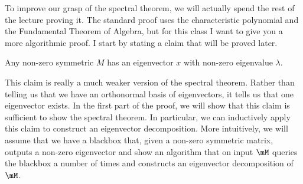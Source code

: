 To improve our grasp of the spectral theorem, we will actually spend the rest of the lecture proving it. The standard proof uses the characteristic polynomial and the Fundamental Theorem of Algebra, but for this class I want to give you a more algorithmic proof. I start by stating a claim that will be proved later.
\begin{claim} \label{claim}
Any non-zero symmetric $M$ has an eigenvector $x$ with non-zero eigenvalue $\lambda.$ 
\end{claim}
This claim is really a much weaker version of the spectral theorem. Rather than telling us that we have an orthonormal basis of eigenvectors, it tells us that one eigenvector exists. In the first part of the proof, we will show that this claim is sufficient to show the spectral theorem. In particular, we can inductively apply this claim to construct an eigenvector decomposition. More intuitively, we will assume that we have a blackbox that, given a non-zero symmetric matrix, outputs a non-zero eigenvector and show an algorithm that on input $\mM$ queries the blackbox a number of times and constructs an eigenvector decomposition of $\mM$.

